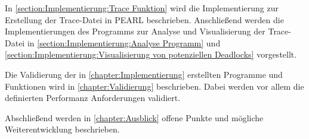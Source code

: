 In \cref{section:Implementierung:Trace Funktion} wird die Implementierung zur Erstellung der Trace-Datei in PEARL beschrieben. Anschließend werden die Implementierungen des Programms zur Analyse und Visualisierung der Trace-Datei in \cref{section:Implementierung:Analyse Programm} und \cref{section:Implementierung:Visualisierung von potenziellen Deadlocks} vorgestellt.

Die Validierung der in \cref{chapter:Implementierung} erstellten Programme und Funktionen wird in \cref{chapter:Validierung} beschrieben. Dabei werden vor allem die definierten Performanz Anforderungen validiert.

Abschließend werden in \cref{chapter:Ausblick} offene Punkte und mögliche Weiterentwicklung beschrieben.